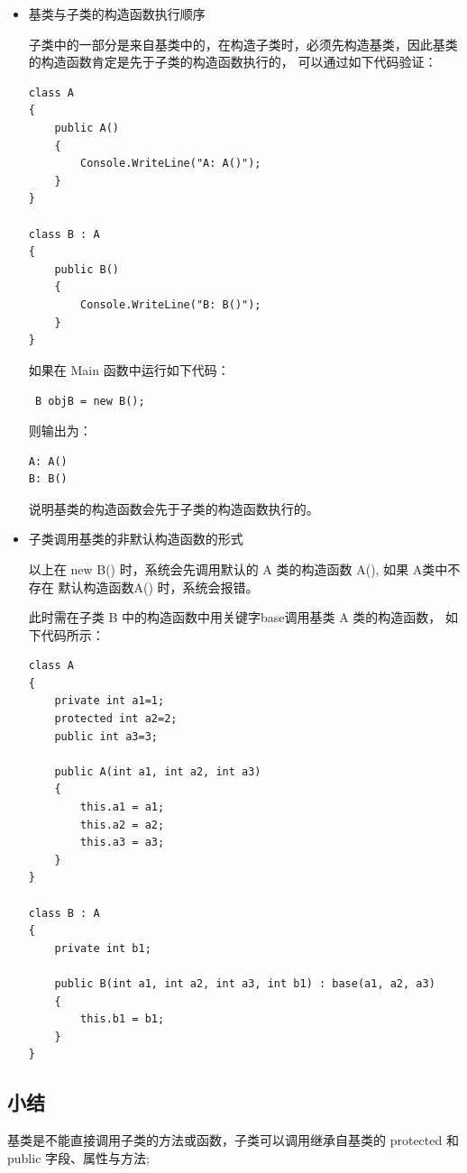 \begin{itemize}
\item {基类与子类的构造函数执行顺序}

子类中的一部分是来自基类中的，在构造子类时，必须先构造基类，因此基类的构造函数肯定是先于子类的构造函数执行的，
可以通过如下代码验证：

\begin{lstlisting}
class A 
{	
	public A()
	{
		Console.WriteLine("A: A()");
	}
}

class B : A
{
	public B()
	{
		Console.WriteLine("B: B()");
	}
}
\end{lstlisting}

如果在 Main 函数中运行如下代码：

\verb| B objB = new B(); |

则输出为：

\begin{verbatim}
A: A() 
B: B()
\end{verbatim}

说明基类的构造函数会先于子类的构造函数执行的。



\item{子类调用基类的非默认构造函数的形式}

以上在 new B() 时，系统会先调用默认的 A 类的构造函数 A(), 如果 A类中不存在 默认构造函数A() 时，系统会报错。

此时需在子类 B 中的构造函数中用关键字base调用基类 A 类的构造函数， 如下代码所示：

\begin{lstlisting}
class A 
{
	private int a1=1;
	protected int a2=2;
	public int a3=3;	

	public A(int a1, int a2, int a3)
	{
		this.a1 = a1;
		this.a2 = a2;
		this.a3 = a3;
	}
}

class B : A
{
	private int b1;
	
	public B(int a1, int a2, int a3, int b1) : base(a1, a2, a3)
	{
		this.b1 = b1;
	}
}
\end{lstlisting}

\end{itemize}



 
\subsection{小结}

 基类是不能直接调用子类的方法或函数，子类可以调用继承自基类的 protected 和 public 字段、属性与方法;
 
